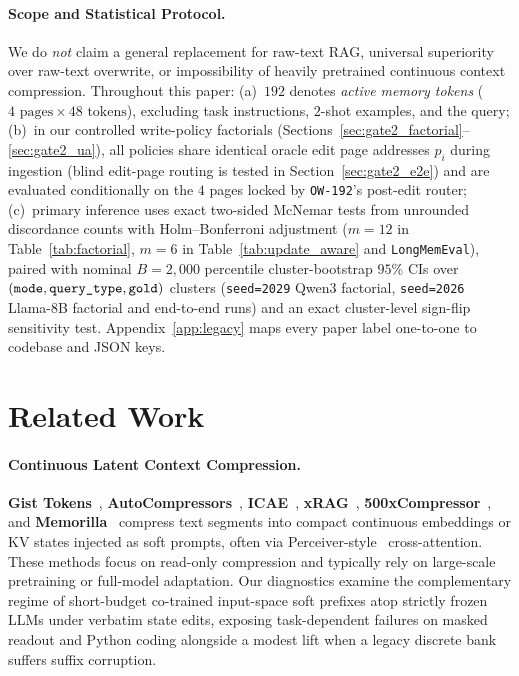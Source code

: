 \documentclass[10pt]{article}
\renewcommand{\_}{\origunderscore\allowbreak}
\begin{document}
\paragraph{Scope and Statistical Protocol.}
We do \emph{not} claim a general replacement for raw-text RAG, universal superiority over raw-text overwrite, or impossibility of heavily pretrained continuous context compression. Throughout this paper: (a)~$192$ denotes \emph{active memory tokens} ($4\text{ pages}\times 48\text{ tokens}$), excluding task instructions, $2$-shot examples, and the query; (b)~in our controlled write-policy factorials (Sections~\ref{sec:gate2_factorial}--\ref{sec:gate2_ua}), all policies share identical oracle edit page addresses $p_i$ during ingestion (blind edit-page routing is tested in Section~\ref{sec:gate2_e2e}) and are evaluated conditionally on the $4$ pages locked by \texttt{OW-192}'s post-edit router; (c)~primary inference uses exact two-sided McNemar tests from unrounded discordance counts with Holm--Bonferroni adjustment ($m=12$ in Table~\ref{tab:factorial}, $m=6$ in Table~\ref{tab:update_aware} and \texttt{LongMemEval}), paired with nominal $B=2{,}000$ percentile cluster-bootstrap $95\%$ CIs over $( \texttt{mode}, \texttt{query\_type}, \texttt{gold} )$ clusters (\texttt{seed=2029} Qwen3 factorial, \texttt{seed=2026} Llama-8B factorial and end-to-end runs) and an exact cluster-level sign-flip sensitivity test. Appendix~\ref{app:legacy} maps every paper label one-to-one to codebase and JSON keys.

\section{Related Work}
\label{sec:related}

\paragraph{Continuous Latent Context Compression.}
\textbf{Gist Tokens}~\citep{mu2023gist}, \textbf{AutoCompressors}~\citep{chevalier2023autocompressors}, \textbf{ICAE}~\citep{ge2024icae}, \textbf{xRAG}~\citep{cheng2024xrag}, \textbf{500xCompressor}~\citep{li2025compressor500x}, and \textbf{Memorilla}~\citep{fallahpour2026memorilla} compress text segments into compact continuous embeddings or KV states injected as soft prompts, often via Perceiver-style~\citep{jaegle2021perceiver} cross-attention. These methods focus on read-only compression and typically rely on large-scale pretraining or full-model adaptation. Our diagnostics examine the complementary regime of short-budget co-trained input-space soft prefixes atop strictly frozen LLMs under verbatim state edits, exposing task-dependent failures on masked readout and Python coding alongside a modest lift when a legacy discrete bank suffers suffix corruption.
\end{document}
